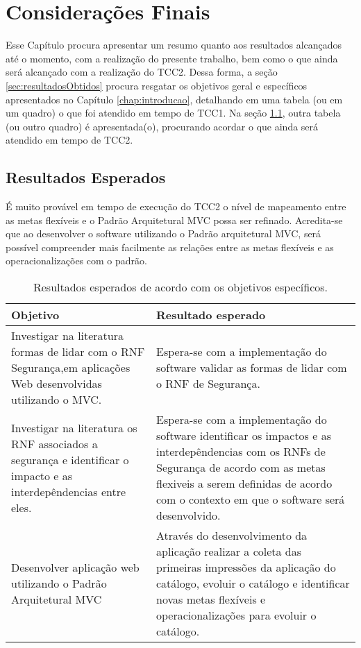 \chapter{Considerações Finais}
\label{chap:consideracoesFinais}

Esse Capítulo procura apresentar um resumo quanto aos resultados alcançados até o momento, com a realização do presente trabalho, bem como o que ainda será alcançado com a realização do TCC2. Dessa forma, a seção \ref{sec:resultadosObtidos} procura resgatar os objetivos geral e específicos apresentados no Capítulo \ref{chap:introducao}, detalhando em uma tabela (ou em um quadro) o que foi atendido em tempo de TCC1. Na seção \ref{sec:resultadosEsperados}, outra tabela (ou outro quadro) é apresentada(o), procurando acordar o que ainda será atendido em tempo de TCC2.

\section{Resultados Esperados}
\label{sec:resultadosEsperados}

É muito provável em tempo de execução do TCC2 o nível de mapeamento entre as metas flexíveis e o  Padrão Arquitetural MVC possa ser refinado. Acredita-se que ao desenvolver o software utilizando o Padrão arquitetural MVC, será possível compreender mais facilmente as relações entre as metas flexíveis e as operacionalizações com o padrão. 


\begin{table}[h!]
	\centering
	\caption{Resultados esperados de acordo com os objetivos específicos.}
	\label{resultadosEsperados}
	\tiny
	\begin{tabular}{@{}p{8cm}p{7.5cm}@{}}
		\toprule
		\textbf{Objetivo} & \textbf{Resultado esperado} \\ \midrule
		Investigar na literatura formas de lidar com o RNF Segurança,em aplicações Web desenvolvidas utilizando o MVC. & Espera-se com a implementação do software validar as formas de lidar com o RNF de Segurança. \\
		\rowcolor[HTML]{C0C0C0} 
		Investigar na literatura os RNF associados a segurança e identificar o impacto e as interdepêndencias entre eles. & Espera-se com a implementação do software identificar os impactos e as interdepêndencias com os RNFs de Segurança de acordo com as metas flexiveis a serem definidas de acordo com o contexto em que o software será desenvolvido. \\
		Desenvolver aplicação web utilizando o Padrão Arquitetural MVC & Através do desenvolvimento da aplicação realizar a coleta das primeiras impressões da aplicação do catálogo, evoluir o catálogo e identificar novas metas flexíveis e operacionalizações para evoluir o catálogo. \\ \bottomrule
	\end{tabular}
\end{table}

